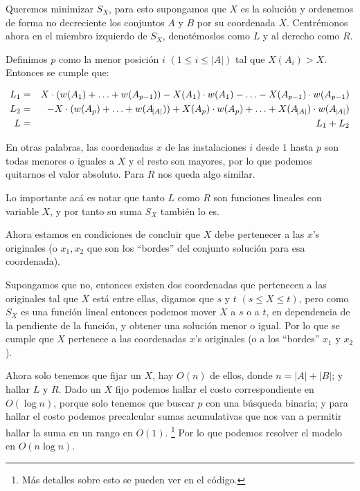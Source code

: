 Queremos minimizar $S_X$, para esto supongamos que $X$ es la solución y ordenemos de forma no decreciente los conjuntos $A$ y $B$ por su coordenada $X$. Centrémonos ahora en el miembro izquierdo de $S_X$, denotémoslos como $L$ y al derecho como $R$.

Definimos $p$ como la menor posición $i$ $(1 \le i \le |A|)$ tal que $X(A_i) > X$. Entonces se cumple que:

\begin{eqnarray*}
    L_1 &=& X \cdot (w(A_1) + \ldots + w(A_{p-1})) - X(A_1) \cdot w(A_1) - \ldots - X(A_{p-1}) \cdot w(A_{p-1}) \\
    L_2 &=& -X \cdot (w(A_p) + \ldots + w(A_{\abs{A}})) + X(A_p) \cdot w(A_p) + \ldots + X(A_{\abs{A}}) \cdot w(A_{\abs{A}}) \\
    L &=& L_1 + L_2
\end{eqnarray*}

En otras palabras, las coordenadas $x$ de las instalaciones $i$ desde $1$ hasta $p$ son todas menores o iguales a $X$ y el resto son mayores, por lo que podemos quitarnos el valor absoluto. Para $R$ nos queda algo similar.

Lo importante acá es notar que tanto $L$ como $R$ son funciones lineales con variable $X$, y por tanto su suma $S_X$ también lo es.

Ahora estamos en condiciones de concluir que $X$ debe pertenecer a las $x$'s originales (o $x_1, x_2$ que son los ``bordes'' del conjunto solución para esa coordenada).

Supongamos que no, entonces existen dos coordenadas que pertenecen a las originales tal que $X$ está entre ellas, digamos que $s$ y $t$ $(s \le X \le t)$, pero como $S_X$ es una función lineal entonces podemos mover $X$ a $s$ o a $t$, en dependencia de la pendiente de la función, y obtener una solución menor o igual. Por lo que se cumple que $X$ pertenece a las coordenadas $x$'s originales (o a los ``bordes'' $x_1$ y $x_2$).

Ahora solo tenemos que fijar un $X$, hay $O(n)$ de ellos, donde $n = |A| + |B|$; y hallar $L$ y $R$. Dado un $X$ fijo podemos hallar el costo correspondiente en $O(\log n )$, porque solo tenemos que buscar $p$ con una búsqueda binaria; y para hallar el costo podemos precalcular sumas acumulativas que nos van a permitir hallar la suma en un rango en $O(1)$. \footnote{Más detalles sobre esto se pueden ver en el código.} Por lo que podemos resolver el modelo en $O(n \log n)$.